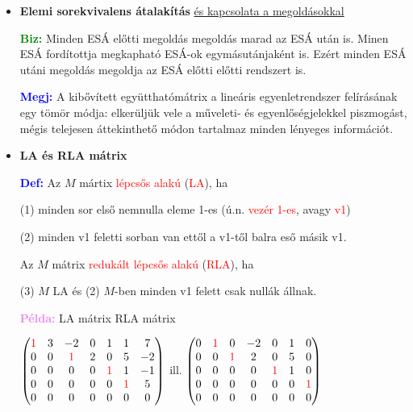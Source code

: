 \documentclass[../../szobeli.tex]{subfiles}
\begin{document}
\begin{itemize}
        \item \textbf{Elemi sorekvivalens átalakítás} \underline{és kapcsolata a megoldásokkal} 
        
            \textcolor{green}{\textbf{Biz:}} Minden ESÁ előtti megoldás megoldás marad az ESÁ után is. Minen ESÁ fordítottja megkapható ESÁ-ok egymásutánjaként is. Ezért minden ESÁ utáni megoldás megoldja az ESÁ előtti előtti rendszert is. 

            \textcolor{blue}{\textbf{Megj:}} A kibővített együtthatómátrix a lineáris egyenletrendszer felírásának egy tömör módja: elkerüljük vele a műveleti- és egyenlőségjelekkel piszmogást, mégis telejesen áttekinthető módon tartalmaz minden lényeges információt.

        \item \textbf{LA és RLA mátrix}
        
            \textcolor{blue}{\textbf{Def:}} Az $M$ mártix \textcolor{red}{lépcsős alakú} (\textcolor{red}{LA}), ha 
            
            (1) minden sor első nemnulla eleme 1-es (ú.n. \textcolor{red}{vezér 1-es}, avagy \textcolor{red}{v1}) 

            (2) minden v1 feletti sorban van ettől a v1-től balra eső másik v1.

            Az $M$ mátrix \textcolor{red}{redukált lépcsős alakú} (\textcolor{red}{RLA}), ha 

            (3) $M$ LA és (2) $M$-ben minden v1 felett csak nullák állnak. 

            \textcolor{violet}{\textbf{Példa:}} LA mátrix \hspace{30mm} RLA mátrix

            $ \begin{pmatrix}
                \textcolor{red}{1} & 3 & -2 & 0 & 1 & 1 & 7 \\
                0 & 0 & \textcolor{red}{1} & 2 & 0 & 5 & -2 \\
                0 & 0 & 0 & 0 & \textcolor{red}{1} & 1 & -1 \\
                0 & 0 & 0 & 0 & 0 & \textcolor{red}{1} & 5 \\
                0 & 0 & 0 & 0 & 0 & 0 & 0 
            \end{pmatrix}  $ ill. 
            $ \begin{pmatrix}
                0 & \textcolor{red}{1} & 0 & -2 & 0 & 1 & 0 \\
                0 & 0 & \textcolor{red}{1} & 2 & 0 & 5 & 0 \\
                0 & 0 & 0 & 0 & \textcolor{red}{1} & 1 & 0 \\
                0 & 0 & 0 & 0 & 0 & 0 & \textcolor{red}{1} \\
                0 & 0 & 0 & 0 & 0 & 0 & 0 
                \end{pmatrix}  $


\end{itemize}
\end{document}
